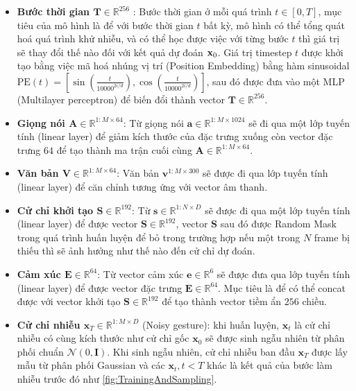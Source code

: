 \begin{itemize}
	\item \textbf{Bước thời gian $\mathbf{T} \in \mathbb{R}^{256}$ }: Bước thời gian ở mỗi quá trình $t \in [0, T]$, mục tiêu của mô hình là để với bước thời gian $t$ bất kỳ, mô hình có thể tổng quát hoá quá trình khử nhiễu, và có thể học được việc với từng bước $t$ thì giá trị sẽ thay đổi thế nào đối với kết quả dự đoán $\mathbf{x}_0$. Giá trị timestep $t$ được khởi tạo bằng việc mã hoá nhúng vị trí (Position Embedding) bằng hàm sinusoidal $\text{PE}(t) = \left[ \sin{\left(\frac{t}{10000^{2i / d}}\right)}, \cos{\left(\frac{t}{10000^{2i / d}}\right)} \right]$, sau đó được đưa vào một MLP (Multilayer perceptron) để biến đổi thành vector $\mathbf{T}  \in \mathbb{R}^{256}$.
	
	  \item \textbf{Giọng nói $\mathbf{A} \in \mathbb{R}^{1:M \times 64}$}: Từ giọng nói $\mathbf{a} \in \mathbb{R}^{1:M \times 1024}$ sẽ đi qua một lớp tuyến tính (linear layer) để giảm kích thước của đặc trưng xuống còn vector đặc trưng $64$ để tạo thành ma trận cuối cùng $\mathbf{A} \in \mathbb{R}^{1:M \times 64}$.
	  
	  \item \textbf{Văn bản $\mathbf{V} \in \mathbb{R}^{1:M \times 64}$}: Văn bản $\mathbf{v}^{1:M \times 300}$ sẽ được đi qua lớp tuyến tính (linear layer) để căn chỉnh tương ứng với vector âm thanh.
	
	\item \textbf{Cử chỉ khởi tạo $\mathbf{S} \in \mathbb{R}^{192}$}: Từ $\mathbf{s} \in \mathbb{R}^{1:N \times D}$ sẽ được đi qua một lớp tuyến tính (linear layer) để được vector $\mathbf{S} \in \mathbb{R}^{192}$, vector $\mathbf{S}$ sau đó được Random Mask trong quá trình huấn luyện để bỏ trong trường hợp nếu một trong $N$ frame bị thiếu thì sẽ ảnh hưởng như thế nào đến cử chỉ dự đoán.

  \item \textbf{Cảm xúc $\mathbf{E} \in \mathbb{R}^{64}$}: Từ vector cảm xúc $\mathbf{e} \in \mathbb{R}^{6}$ sẽ được đưa qua lớp tuyến tính (linear layer) để được vector đặc trưng $\mathbf{E} \in \mathbb{R}^{64}$. Mục tiêu là để có thể concat được với vector khởi tạo $\mathbf{S} \in \mathbb{R}^{192} $ để tạo thành vector tiềm ẩn $256$ chiều.
  
	\item \textbf{Cử chỉ nhiễu $\mathbf{x}_{T} \in \mathbb{R}^{1:M \times D}$} (Noisy gesture): khi huấn luyện, $\mathbf{x}_{t}$ là cử chỉ nhiễu có cùng kích thước như cử chỉ gốc $\mathbf{x}_{0}$ sẽ được sinh ngẫu nhiên từ phân phối chuẩn $\mathcal{N}(0, \mathbf{I})$. Khi sinh ngẫu nhiên, cử chỉ nhiễu ban đầu $\mathbf{x}_{T}$ được lấy mẫu từ phân phối Gaussian và các $\mathbf{x}_{t}, t<T$ khác là kết quả của bước làm nhiễu trước đó như \autoref{fig:TrainingAndSampling}.
\end{itemize}

